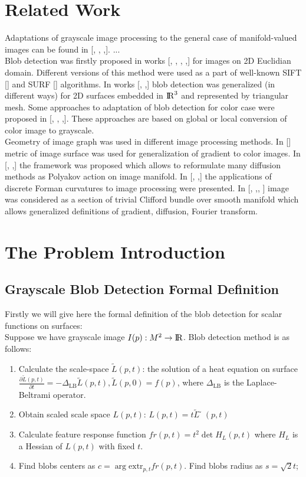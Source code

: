 \documentclass{llncs}
\newcommand{\LaplaceBeltrami}{\Delta_{\mathrm{LB}}}
\newcommand{\partderiv}[2]{\frac{\partial #1}{\partial #2}}
\newcommand{\extr}[1]{\mathrm{extr}_{#1}}
\newcommand{\toreal}{\rightarrow\bbbr}
\begin{document}
\section{Related Work}
Adaptations of grayscale image processing to the general case of manifold-valued images can be found in [, , ,]. ...
\\
Blob detection was firstly proposed in works [, , , ,] for images on 2D Euclidian domain. Different versions of this method were used as a part of well-known SIFT [] and SURF [] algorithms. In works [, ,] blob detection was generalized (in different ways) for 2D surfaces embedded in ${\rm I\!R}^3$ and represented by triangular mesh. Some approaches to adaptation of blob detection for color case were proposed in [, , ,]. These approaches are based on global or local conversion of color image to grayscale.
\\
Geometry of image graph was used in different image processing methods. In [] metric of image surface was used for generalization of gradient to color images. In [, ,] the framework was proposed which allows to reformulate many diffusion methods as Polyakov action on image manifold. In [, ,] the applications of discrete Forman curvatures to image processing were presented. In [, ,, ] image was considered as a section of trivial Clifford bundle over smooth manifold which allows generalized definitions of gradient, diffusion, Fourier transform.

\section{The Problem Introduction}
\subsection{Grayscale Blob Detection Formal Definition}
Firstly we will give here the formal definition of the blob detection for scalar functions on surfaces: \\
Suppose we have  grayscale image $I(p):M^2 \toreal$. Blob detection method is as follows:
\begin{enumerate} 
\item Calculate the scale-space $\tilde{L}(p,t)$: the solution of a heat equation  on surface
  $\partderiv{\tilde{L}(p, t)}{t}=-\LaplaceBeltrami{ \tilde{L}(p, t)},\tilde{L}(p, 0)=f(p)$, where $\LaplaceBeltrami$ is the Laplace-Beltrami operator.
\item Obtain scaled scale space $L(p, t)$: $L(p, t)=t\tilde{L} ̃(p, t)$
\item Calculate feature response function $fr(p, t)=t^2 \det{H_L(p,t)}$ where $H_L$ is a Hessian of $L(p, t)$  with fixed $t$.
\item Find blobs centers as $c=\arg \extr{p,t} fr(p, t)$. Find blobs radius as $s=\sqrt{2} t$;
\end{enumerate}
\end{document}

